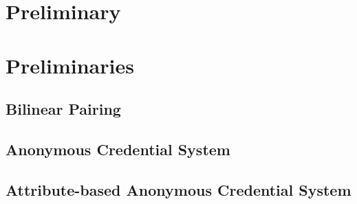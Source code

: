 \section{Preliminary}
\section{Preliminaries}
\subsection{Bilinear Pairing}
\subsection{Anonymous Credential System}
\subsection{Attribute-based Anonymous Credential System}